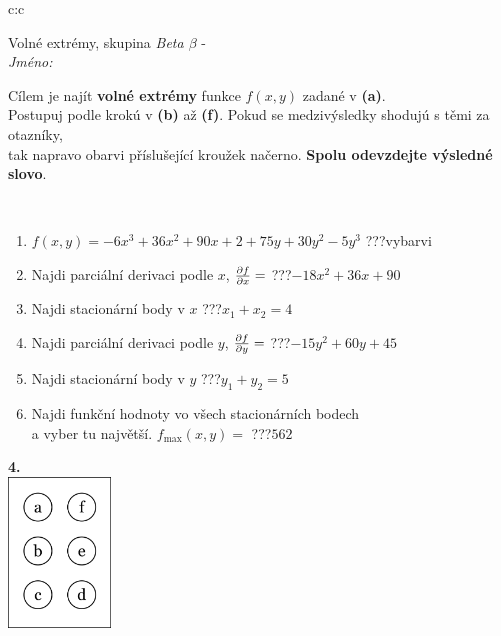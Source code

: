\documentclass[10pt]{report}
\begin{document}
\begin{tabular}{c:c}
\begin{minipage}[c][104.5mm][t]{0.5\linewidth}
\begin{center}
\vspace{7mm}
{\huge Volné extrémy, skupina \textit{Beta $\beta$} -}\\[5mm]
\textit{Jméno:}\phantom{xxxxxxxxxxxxxxxxxxxxxxxxxxxxxxxxxxxxxxxxxxxxxxxxxxxxxxxxxxxxxxxxx}\\[5mm]
\begin{minipage}{0.95\linewidth}
\begin{center}
Cílem je najít \textbf{volné extrémy} funkce $f(x,y)$ zadané v \textbf{(a)}.\\Postupuj podle krokú v \textbf{(b)} až \textbf{(f)}. Pokud se medzivýsledky shodujú s těmi za otazníky,\\tak napravo obarvi příslušející kroužek načerno. \textbf{Spolu odevzdejte výsledné slovo}.
\end{center}
\end{minipage}
\\[1mm]
\begin{minipage}{0.79\linewidth}
\begin{center}
\begin{varwidth}{\linewidth}
\begin{enumerate}
\normalsize
\item $f(x,y)=-6x^3+36x^2+90x+2+75y+30y^2-5y^3$\quad \dotfill\; ???\;\dotfill \quad vybarvi
\item Najdi parciální derivaci podle $x$, $\pdv{f}{x}=$\quad \dotfill\; ???\;\dotfill \quad $-18x^2+36x+90$
\item Najdi stacionární body v $x$\quad \dotfill\; ???\;\dotfill \quad $x_1+x_2=4$
\item Najdi parciální derivaci podle $y$, $\pdv{f}{y}=$\quad \dotfill\; ???\;\dotfill \quad $-15y^2+60y+45$
\item Najdi stacionární body v $y$\quad \dotfill\; ???\;\dotfill \quad $y_1+y_2=5$
\item Najdi funkční hodnoty vo všech stacionárních bodech \\ \phantom{xxxxxx} a vyber tu najvětší. $f_{\text{max}}(x,y)=$\quad \dotfill\; ???\;\dotfill \quad $562$
\end{enumerate}
\end{varwidth}
\end{center}
\end{minipage}
\begin{minipage}{0.20\linewidth}
\begin{center}
{\Huge\bfseries 4.} \\[2mm]
\includegraphics[height=40mm]{../images/braille.png}

\end{center}
\end{minipage}
\end{center}
\end{minipage}
\end{tabular}
\end{document}

